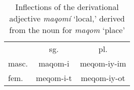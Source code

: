 \begin{table}[ht]
\centering
\setlength{\extrarowheight}{8pt}
\begin{tabular}{lcc}
\toprule
& sg. & pl.  \\
\cmidrule(lr){2-3}
masc. & maqom-i &  meqom-iy-im\\
fem. & meqom-i-t  & meqom-iy-ot  \\
\bottomrule
\end{tabular}
\label{tab:der-adjs}
\caption{Inflections of the derivational adjective \textit{maqom\'{i}} `local,' derived from the noun for \textit{maqom} `place'}
\end{table}



